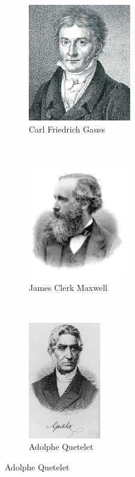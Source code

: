 \documentclass[12pt]{article}
\begin{document}
\begin{figure}
    \centering
    \begin{subfigure}[t]{0.33\textwidth}
        \centering
        \includegraphics[height=2in]{gauss.jpg}
        \caption*{Carl Friedrich Gauss}
    \end{subfigure}%
    ~ 
    \begin{subfigure}[t]{0.33\textwidth}
        \centering
        \includegraphics[trim=0 1cm 0 0, clip, height=2in]{maxwell.png}
        \caption*{James Clerk Maxwell}
    \end{subfigure}%
    ~
    \begin{subfigure}[t]{0.33\textwidth}
        \centering
        \includegraphics[trim=0 5cm 0 0, clip, height=2in]{quetelet.jpg}
        \caption*{Adolphe Quetelet}
    \end{subfigure}
\end{figure}
\end{document}
